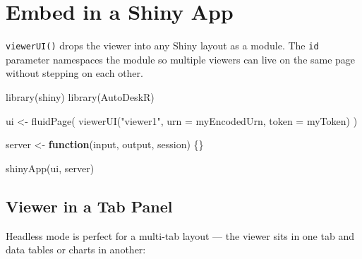 \documentclass[
  11pt,
  letterpaper,
  DIV=11,
  numbers=noendperiod]{scrreprt}
\newenvironment{Shaded}{\begin{snugshade}}{\end{snugshade}}
\newcommand{\AttributeTok}[1]{\textcolor[rgb]{0.40,0.45,0.13}{#1}}
\newcommand{\CommentTok}[1]{\textcolor[rgb]{0.37,0.37,0.37}{#1}}
\newcommand{\ControlFlowTok}[1]{\textcolor[rgb]{0.00,0.23,0.31}{\textbf{#1}}}
\newcommand{\FunctionTok}[1]{\textcolor[rgb]{0.28,0.35,0.67}{#1}}
\newcommand{\NormalTok}[1]{\textcolor[rgb]{0.00,0.23,0.31}{#1}}
\newcommand{\OtherTok}[1]{\textcolor[rgb]{0.00,0.23,0.31}{#1}}
\newcommand{\SpecialCharTok}[1]{\textcolor[rgb]{0.37,0.37,0.37}{#1}}
\newcommand{\StringTok}[1]{\textcolor[rgb]{0.13,0.47,0.30}{#1}}
\begin{document}
\section{Embed in a Shiny App}\label{embed-in-a-shiny-app}

\texttt{viewerUI()} drops the viewer into any Shiny layout as a module.
The \texttt{id} parameter namespaces the module so multiple viewers can
live on the same page without stepping on each other.

\begin{Shaded}
\begin{Highlighting}[]
\FunctionTok{library}\NormalTok{(shiny)}
\FunctionTok{library}\NormalTok{(AutoDeskR)}

\NormalTok{ui }\OtherTok{\textless{}{-}} \FunctionTok{fluidPage}\NormalTok{(}
  \FunctionTok{viewerUI}\NormalTok{(}\StringTok{"viewer1"}\NormalTok{, }\AttributeTok{urn =}\NormalTok{ myEncodedUrn, }\AttributeTok{token =}\NormalTok{ myToken)}
\NormalTok{)}

\NormalTok{server }\OtherTok{\textless{}{-}} \ControlFlowTok{function}\NormalTok{(input, output, session) \{\}}

\FunctionTok{shinyApp}\NormalTok{(ui, server)}
\end{Highlighting}
\end{Shaded}

\subsection{Viewer in a Tab Panel}\label{viewer-in-a-tab-panel}

Headless mode is perfect for a multi-tab layout --- the viewer sits in
one tab and data tables or charts in another:

\begin{Shaded}
\end{Shaded}
\end{document}
